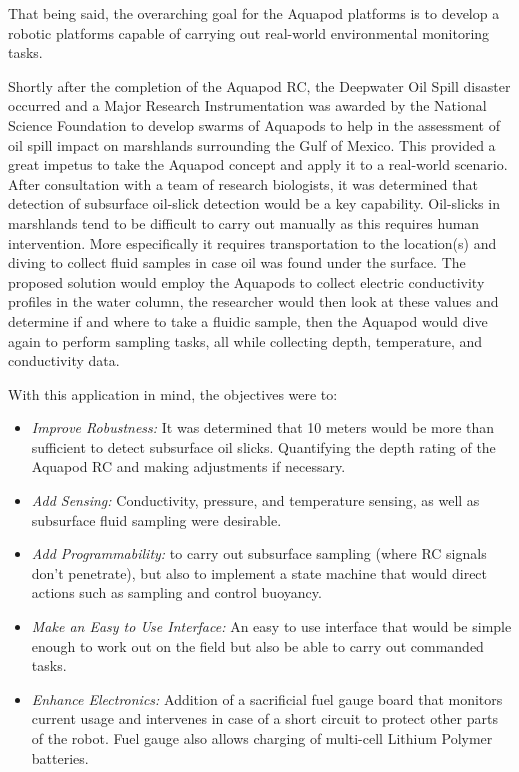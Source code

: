 That being said, the overarching goal for the Aquapod platforms is to develop a robotic platforms capable of carrying out real-world environmental monitoring tasks. 


Shortly after the completion of the Aquapod RC, the Deepwater Oil Spill disaster occurred and a Major Research Instrumentation was awarded by the National Science Foundation to develop swarms of Aquapods to help in the assessment of oil spill impact on marshlands surrounding the Gulf of Mexico.  This provided a great impetus to take the Aquapod concept and apply it to a real-world scenario. After consultation with a team of research biologists, it was determined that detection of subsurface oil-slick detection would be a key capability. Oil-slicks in marshlands tend to be difficult to carry out manually as this requires human intervention. More especifically it requires transportation to the location(s) and diving to collect fluid samples in case oil was found under the surface. The proposed solution would employ the Aquapods to collect electric conductivity profiles in the water column, the researcher would then look at these values and determine if and where to take a fluidic sample, then the Aquapod would dive again to perform sampling tasks, all while collecting depth, temperature, and conductivity data.  


With this application in mind, the objectives were to: 

\begin{itemize}
	\item \emph{Improve Robustness:} It was determined that 10 meters would be more than sufficient to detect subsurface oil slicks. Quantifying the depth rating of the Aquapod RC and making adjustments if necessary. 
	\item \emph{Add Sensing:} Conductivity, pressure, and temperature sensing, as well as subsurface fluid sampling were desirable. 
	\item \emph{Add Programmability:} to carry out subsurface sampling (where RC signals don't penetrate), but also to implement a state machine that would direct actions such as sampling and control buoyancy.
	\item \emph{Make an Easy to Use Interface:} An easy to use interface that would be simple enough to work out on the field but also be able to carry out commanded tasks. 
	\item \emph{Enhance Electronics:} Addition of a sacrificial fuel gauge board that monitors current usage and intervenes in case of a short circuit to protect other parts of the robot. Fuel gauge also allows charging of multi-cell Lithium Polymer batteries. 
\end{itemize}


